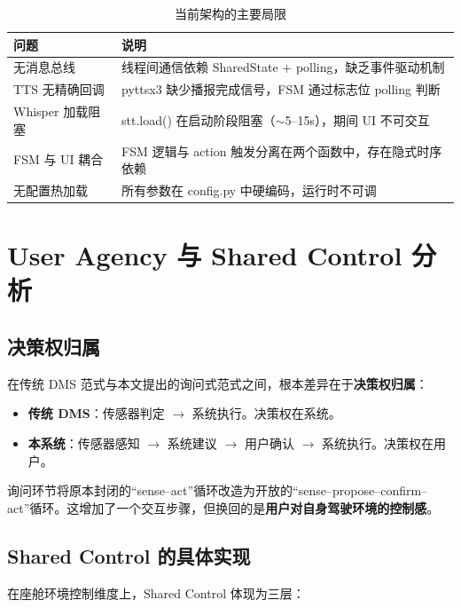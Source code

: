 \documentclass[12pt,a4paper]{ctexart}
\begin{document}
\begin{table}[htbp]
\centering
\caption{当前架构的主要局限}
\begin{tabular}{@{}p{3.5cm}p{7.5cm}@{}}
\toprule
\textbf{问题} & \textbf{说明} \\
\midrule
无消息总线 & 线程间通信依赖 SharedState + polling，缺乏事件驱动机制 \\
TTS 无精确回调 & pyttsx3 缺少播报完成信号，FSM 通过标志位 polling 判断 \\
Whisper 加载阻塞 & stt.load() 在启动阶段阻塞（$\sim$5--15s），期间 UI 不可交互 \\
FSM 与 UI 耦合 & FSM 逻辑与 action 触发分离在两个函数中，存在隐式时序依赖 \\
无配置热加载 & 所有参数在 config.py 中硬编码，运行时不可调 \\
\bottomrule
\end{tabular}
\end{table}

\section{User Agency 与 Shared Control 分析}

\subsection{决策权归属}

在传统 DMS 范式与本文提出的询问式范式之间，根本差异在于\textbf{决策权归属}：

\begin{itemize}
    \item \textbf{传统 DMS}：传感器判定 $\rightarrow$ 系统执行。决策权在系统。
    \item \textbf{本系统}：传感器感知 $\rightarrow$ 系统建议 $\rightarrow$ 用户确认 $\rightarrow$ 系统执行。决策权在用户。
\end{itemize}

询问环节将原本封闭的“sense--act”循环改造为开放的“sense--propose--confirm--act”循环。这增加了一个交互步骤，但换回的是\textbf{用户对自身驾驶环境的控制感}。

\subsection{Shared Control 的具体实现}

在座舱环境控制维度上，Shared Control 体现为三层：
\end{document}
